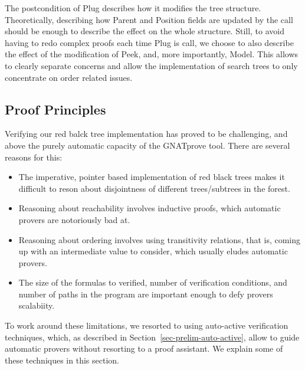 \documentclass[11pt,a4paper]{article}
\begin{document}
The postcondition of Plug describes how it modifies the tree structure. Theoretically,
describing how Parent and Position fields are updated by the call should be enough to
describe the effect on the whole structure. Still, to avoid having to redo complex
proofs each time Plug is call, we choose to also describe the effect of the modification
of Peek, and, more importantly, Model. This allows to clearly separate concerns and allow
the implementation of search trees to only concentrate on order related issues.

\subsection{Proof Principles}


Verifying our red balck tree implementation has proved to be challenging, and above the
purely automatic capacity of the GNATprove tool. There are several reasons for this:

\begin{itemize}
 \item The imperative, pointer based implementation of red black trees makes it difficult
 to reson about disjointness of different trees/subtrees in the forest.
 \item Reasoning about reachability involves inductive proofs, which automatic provers are
 notoriously bad at.
 \item Reasoning about ordering involves using transitivity relations, that is, coming up with
 an intermediate value to consider, which usually eludes automatic provers.
 \item The size of the formulas to verified, number of verification conditions, and number of
 paths in the program are important enough to defy provers scalabiity.
\end{itemize}

To work around these limitations, we resorted to using auto-active verification techniques, which,
as described in Section~\ref{sec-prelim-auto-active}, allow to guide automatic provers without
resorting to a proof assistant. We explain some of these techniques in this section.
\end{document}
